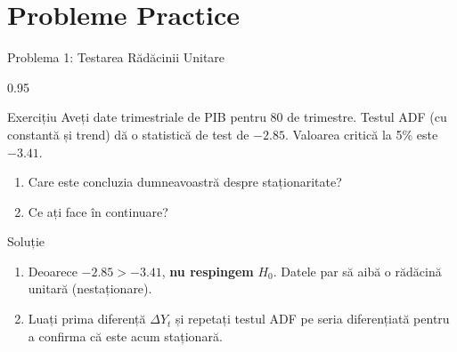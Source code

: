 \documentclass[9pt, aspectratio=169, t]{beamer}
\begin{document}
\section{Probleme Practice}

\begin{frame}{Problema 1: Testarea Rădăcinii Unitare}
    \begin{cminipage}{0.95\textwidth}
    \begin{block}{Exercițiu}
        Aveți date trimestriale de PIB pentru 80 de trimestre. Testul ADF (cu constantă și trend) dă o statistică de test de $-2.85$. Valoarea critică la 5\% este $-3.41$.

        \vspace{0.3cm}
        \begin{enumerate}\setlength{\itemsep}{0pt}
            \item Care este concluzia dumneavoastră despre staționaritate?
            \item Ce ați face în continuare?
        \end{enumerate}
    \end{block}

    \vspace{0.3cm}
    \pause
    \begin{exampleblock}{Soluție}
        \begin{enumerate}\setlength{\itemsep}{0pt}
            \item Deoarece $-2.85 > -3.41$, \textbf{nu respingem} $H_0$. Datele par să aibă o rădăcină unitară (nestaționare).
            \item Luați prima diferență $\Delta Y_t$ și repetați testul ADF pe seria diferențiată pentru a confirma că este acum staționară.
        \end{enumerate}
    \end{exampleblock}
    \end{cminipage}
\end{frame}
\end{document}
